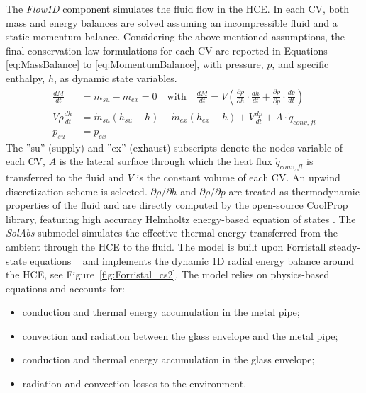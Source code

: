 \documentclass[final,3p,times,review]{elsarticle}
\providecommand{\DIFadd}[1]{{\protect\color{blue}\uwave{#1}}} %
\providecommand{\DIFdel}[1]{{\protect\color{red}\sout{#1}}}                      %
\providecommand{\DIFaddbegin}{} %
\providecommand{\DIFaddend}{} %
\providecommand{\DIFdelbegin}{} %
\providecommand{\DIFdelend}{} %
\begin{document}
The \textit{Flow1D} component simulates the fluid flow in the HCE. In each CV, both mass and energy balances are solved assuming an incompressible fluid and a static momentum balance. Considering the above mentioned assumptions, the final conservation law formulations for each CV are reported in Equations \ref{eq:MassBalance} to \ref{eq:MomentumBalance}, with pressure, $p$, and specific enthalpy, $h$, as dynamic state variables.
%
\begin{align}
\label{eq:MassBalance}
\frac{dM}{dt} & = \dot{m}_{su}-\dot{m}_{ex} = 0  \quad \text{with} \quad
\frac{dM}{dt} = V \left( \frac{\partial \rho}{\partial h}  \cdot \frac{dh}{dt} + \frac{\partial \rho}{\partial p} \cdot \frac{dp}{dt} \right) \\
\label{eq:EnergyBalance}
V\rho \frac{dh}{dt} & = \dot{m}_{su}(h_{su} - h) - \dot{m}_{ex}(h_{ex} - h) + V \frac{dp}{dt} + A \cdot \dot{q}_{conv,fl} \\
\label{eq:MomentumBalance}
p_{su} & = p_{ex}
\end{align}
%
The ''su'' (supply) and ''ex'' (exhaust) subscripts denote the nodes variable of each CV, $A$ is the lateral surface through which the heat flux $\dot{q}_{conv,fl}$ is transferred to the fluid and $V$ is the constant volume of each CV. An upwind discretization scheme is selected.
$\partial \rho / \partial h$ and $\partial \rho / \partial p$ are treated as  thermodynamic properties of the fluid and are directly computed by the open-source CoolProp library, featuring high accuracy Helmholtz energy-based equation of states \cite{Bell_CoolProp_2013}.
The \textit{SolAbs} submodel simulates the effective thermal energy transferred from the ambient through the HCE to the fluid. The model is built upon Forristall steady-state equations ~\cite{Forristall2003} \DIFdelbegin \DIFdel{and implements }\DIFdelend \DIFaddbegin \DIFadd{with }\DIFaddend the dynamic 1D radial energy balance around the HCE, see Figure~\ref{fig:Forristal_cs2}. The model relies on physics-based equations and accounts for:
%
 \begin{itemize} 
	\item conduction and thermal energy accumulation in the metal pipe;
	\item convection and radiation between the glass envelope and the metal pipe;
	\item conduction and thermal energy accumulation in the glass envelope;
	\item radiation and convection losses to the environment.
 \end{itemize} 
\end{document}
